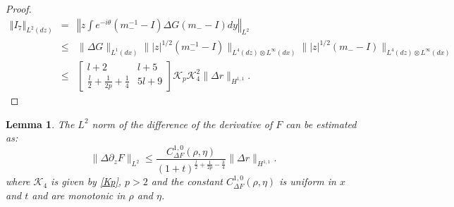 \documentclass{amsart}
\theoremstyle{plain}
\newtheorem{lemma}[theorem]{Lemma}
\theoremstyle{remark}
\numberwithin{equation}{section}
\newcommand{\norm}[2]{\left\Vert #1\right\Vert_{#2}}
\newcommand{\Twomat}[4]
{
\left[
	\begin{array}{cc}
		{#1}	&	{#2}	\\[10pt]
		{#3}	&	{#4}
		\end{array}
\right]
}
\begin{document}
\begin{proof}
    \begin{eqnarray*}
         \norm{I_7}{L^2 (dz)} & =& \left\Vert z \int e^{-i\theta}(m_-^{-1}-I)\Delta G(m_--I) dy\right\Vert_{L^2}\\
        &\leq & \|\Delta G\|_{L^1(dx)}\||z|^{1/2}(m_-^{-1}-I)\|_{L^4(dz)\otimes L^\infty(dx)}\||z|^{1/2}(m_--I)\|_{L^4(dz)\otimes L^\infty(dx)}\\
        &\leq& \Twomat{l+2}{l+5}{\frac{l}{2}+\frac{1}{2p}+\frac{1}{4}}{5l+9}\mathcal{K}_p\mathcal{K}_4^2\|\Delta r\|_{H^{1,1}}.
    \end{eqnarray*}

  

\end{proof}

\begin{lemma}The $L^2$ norm of the difference of the derivative of $F$ can be estimated as:
\label{le:dDF}
    \begin{equation}
        \|\Delta \partial_z F\|_{L^2} \leq \frac{C^{1,0}_{\Delta F}(\rho, \eta)}{(1+t)^{\frac{l}{2}+\frac{1}{2p}-\frac{3}{4}}}\|\Delta r\|_{H^{1,1}}.
    \end{equation}
    where $\mathcal{K}_4$ is given by \eqref{Kp}, $p>2$ and the constant $C^{1,0}_{\Delta F}(\rho, \eta)$ is uniform in $x$ and $t$ and are monotonic in $\rho$ and $\eta$.
\end{lemma}
\end{document}
